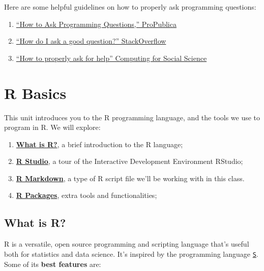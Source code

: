 \documentclass[]{book}
\providecommand{\tightlist}{%
  \setlength{\itemsep}{0pt}\setlength{\parskip}{0pt}}
\begin{document}
Here are some helpful guidelines on how to properly ask programming
questions:

\begin{enumerate}
\def\labelenumi{\arabic{enumi}.}
\tightlist
\item
  \href{https://www.propublica.org/nerds/how-to-ask-programming-questions}{``How
  to Ask Programming Questions,'' ProPublica}
\item
  \href{https://stackoverflow.com/help/how-to-ask}{``How do I ask a good
  question?'' StackOverflow}
\item
  \href{https://cfss.uchicago.edu/faq/asking-questions/}{``How to
  properly ask for help'' Computing for Social Science}
\end{enumerate}

\chapter{R Basics}\label{r-basics}

This unit introduces you to the R programming language, and the tools we
use to program in R. We will explore:

\begin{enumerate}
\def\labelenumi{\arabic{enumi}.}
\tightlist
\item
  \textbf{\protect\hyperlink{what-is-r}{What is R?}}, a brief
  introduction to the R language;
\item
  \textbf{\protect\hyperlink{r-studio-1}{R Studio}}, a tour of the
  Interactive Development Environment RStudio;
\item
  \textbf{\protect\hyperlink{r-markdown}{R Markdown}}, a type of R
  script file we'll be working with in this class.
\item
  \textbf{\protect\hyperlink{r-packages-1}{R Packages}}, extra tools and
  functionalities;
\end{enumerate}

\hypertarget{what-is-r}{\section{What is R?}\label{what-is-r}}

R is a versatile, open source programming and scripting language that's
useful both for statistics and data science. It's inspired by the
programming language
\href{https://en.wikipedia.org/wiki/S_(programming_language)}{\texttt{S}}.
Some of its \textbf{best features} are:
\end{document}
